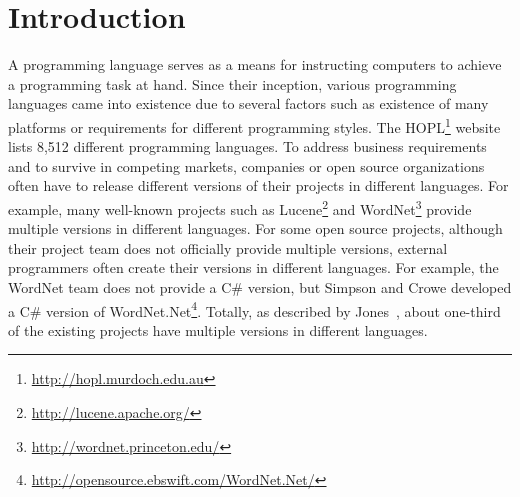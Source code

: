 \section{Introduction}
\label{sec:introduction}

A programming language serves as a means for instructing computers
to achieve a programming task at hand. Since their inception,
various programming languages came into existence due to several
factors such as existence of many platforms or requirements for
different programming styles. The
HOPL\footnote{\url{http://hopl.murdoch.edu.au}} website lists 8,512
different programming languages. To address business requirements
and to survive in competing markets, companies or open source
organizations often have to release different 
versions of their projects in different languages. For
example, many well-known projects such as
Lucene\footnote{\url{http://lucene.apache.org/}} and
WordNet\footnote{\url{http://wordnet.princeton.edu/}} provide
multiple versions in different languages. For some open source
projects, although their project team does not officially provide multiple
versions, external programmers often create their versions in
different languages. For example, the WordNet team does not provide a C\#
version, but Simpson and Crowe developed a C\# version of
WordNet.Net\footnote{\url{http://opensource.ebswift.com/WordNet.Net/}}.
Totally, as described by Jones~\cite{jones1998estimating}, about
one-third of the existing projects have multiple versions in
different languages.



